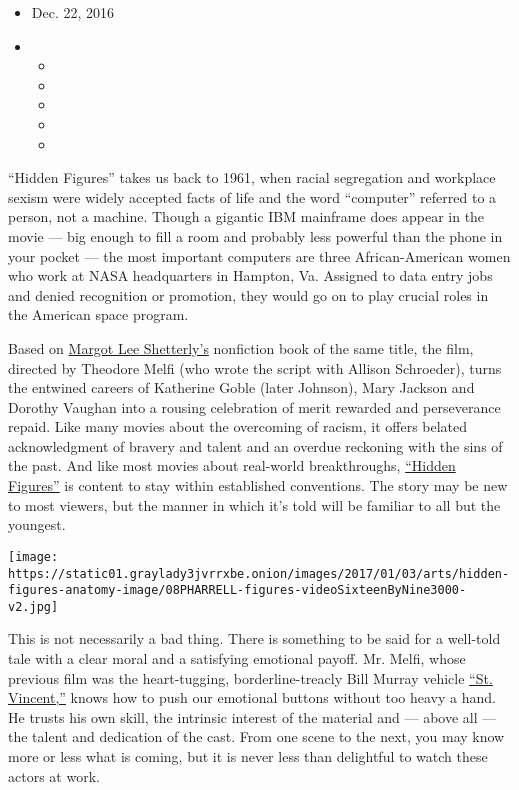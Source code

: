 \begin{itemize}
\item
  Dec. 22, 2016
\item
  \begin{itemize}
  \item
  \item
  \item
  \item
  \item
  \end{itemize}
\end{itemize}

``Hidden Figures'' takes us back to 1961, when racial segregation and
workplace sexism were widely accepted facts of life and the word
``computer'' referred to a person, not a machine. Though a gigantic IBM
mainframe does appear in the movie --- big enough to fill a room and
probably less powerful than the phone in your pocket --- the most
important computers are three African-American women who work at NASA
headquarters in Hampton, Va. Assigned to data entry jobs and denied
recognition or promotion, they would go on to play crucial roles in the
American space program.

Based on
\href{http://margotleeshetterly.com/hidden-figures-nasas-african-american-computers/}{Margot
Lee Shetterly's} nonfiction book of the same title, the film, directed
by Theodore Melfi (who wrote the script with Allison Schroeder), turns
the entwined careers of Katherine Goble (later Johnson), Mary Jackson
and Dorothy Vaughan into a rousing celebration of merit rewarded and
perseverance repaid. Like many movies about the overcoming of racism, it
offers belated acknowledgment of bravery and talent and an overdue
reckoning with the sins of the past. And like most movies about
real-world breakthroughs,
\href{https://www.nytimes3xbfgragh.onion/2016/05/22/movies/taraji-p-henson-octavia-spencer-hidden-figures-rocket-science-and-race.html}{``Hidden
Figures''} is content to stay within established conventions. The story
may be new to most viewers, but the manner in which it's told will be
familiar to all but the youngest.

\texttt{[image: https://static01.graylady3jvrrxbe.onion/images/2017/01/03/arts/hidden-figures-anatomy-image/08PHARRELL-figures-videoSixteenByNine3000-v2.jpg]}

This is not necessarily a bad thing. There is something to be said for a
well-told tale with a clear moral and a satisfying emotional payoff. Mr.
Melfi, whose previous film was the heart-tugging, borderline-treacly
Bill Murray vehicle
\href{https://www.youtube.com/watch?v=9dP5lJnJHXg}{``St. Vincent,''}
knows how to push our emotional buttons without too heavy a hand. He
trusts his own skill, the intrinsic interest of the material and ---
above all --- the talent and dedication of the cast. From one scene to
the next, you may know more or less what is coming, but it is never less
than delightful to watch these actors at work.


